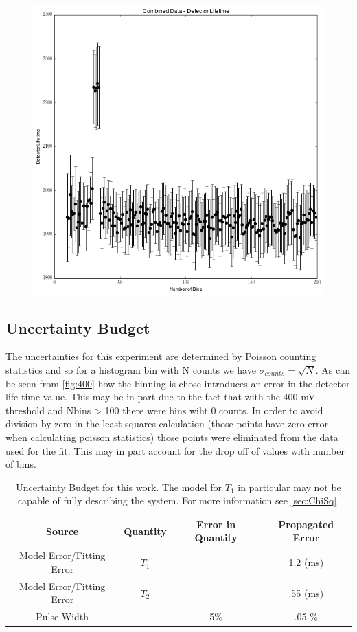 \documentclass[11pt,letterpaper]{article}
\begin{document}
\begin{figure}[h!]
  \centering
      \includegraphics[scale=.7]{combinemVDect.png}
      \caption{}
      \label{fig:combine}
\end{figure}
\subsection{Uncertainty Budget}
The uncertainties for this experiment are determined by Poisson counting statistics and so for a histogram bin with N counts we have $\sigma_{counts}=\sqrt{N}$. As can be seen from \ref{fig:400} how the binning is chose introduces an error in the detector life time value. This may be in part due to the fact that with the 400 mV threshold and Nbins > 100 there were bins wiht 0 counts. In order to avoid division by zero in the least squares calculation (those points have zero error when calculating poisson statistics) those points were eliminated from the data used for the fit. This may in part account for the drop off of values with number of bins.
\begin{table}[!h]
	\begin{center} 
		\begin{tabular}{|c|c|c|c|} \hline 
			Source & Quantity&  Error in Quantity  & Propagated Error  \\ \hline \hline
			Model Error/Fitting Error& $T_1$ &  & 1.2 (ms)\\ \hline
			Model Error/Fitting Error& $T_2$ & & .55 (ms)\\ \hline
			Pulse Width&  & 5\% & .05 \%\\
			\hline
		\end{tabular}
        \caption{Uncertainty Budget for this work. The model for $T_1$ in particular may not be capable of fully describing the system. For more information see \ref{sec:ChiSq}.}
	\end{center}
\end{table}
\end{document}
